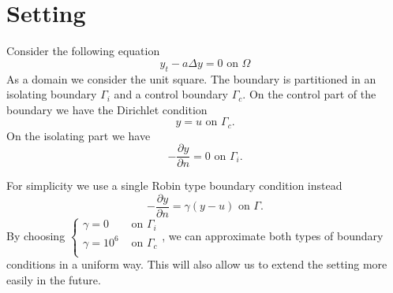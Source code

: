 \documentclass[
12pt, %
a4paper, %
onecolumn, %
portrait %
]{article}
\begin{document}
\pagestyle{myheadings} %
\markright{\doctitle} %


\thispagestyle{plain} %

\printtitle %

\section{Setting}
Consider the following equation
\begin{equation}
y_t -  a \Delta y = 0 \text{ on } \Omega
\end{equation}
As a domain we consider the unit square. The boundary is partitioned in an isolating boundary $\Gamma_i$ and a control boundary $\Gamma_c$.
On the control part of the boundary we have the Dirichlet condition
\begin{equation}
y = u \text{ on } \Gamma_c.
\end{equation}
On the isolating part we have
\begin{equation}
- \frac{\partial y}{\partial n} = 0 \text{ on } \Gamma_i.
\end{equation}

For simplicity we use a single Robin type boundary condition instead
\begin{equation}
- \frac{\partial y}{\partial n} = \gamma (y - u) \text{ on } \Gamma.
\label{eq:robin-bc}
\end{equation}
By choosing 
$\begin{cases}
 \gamma = 0 &\text{ on } \Gamma_i \\ 
\gamma = 10^{6} &\text{ on } \Gamma_c \\
\end{cases}
$,
we can approximate both types of boundary conditions in a uniform way.
This will also allow us to extend the setting more easily in the future.
\end{document}
